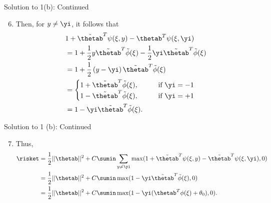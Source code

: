 \documentclass[aspectratio=169]{beamer}
\newcommand{\phitxi}{\tilde{\phi}(\xi)}
\renewcommand{\phixi}{\phi(\xi)}
\newcommand{\psixiy}{\psi(\xi, y)}
\newcommand{\psixiyi}{\psi(\xi, \yi)}
\newcommand{\thetabt}{\tilde{\thetab}}
\begin{document}
\begin{frame}{Solution to 1(b): Continued}
	\begin{enumerate}
		\setcounter{enumi}{5}
		\item Then, for $y \neq \yi$, it follows that 
				\begin{align*}
					& 1 + \thetabt^T \psixiy - \thetab^T \psixiyi \\
					&= 1 + \frac{1}{2} y \thetabt^T \phitxi - \frac{1}{2} \yi \thetabt^T \phitxi \\
					&= 1 + \frac{1}{2} \left(y - \yi \right) \thetabt^T \phitxi \\
					&= \begin{cases}
						1 + \thetabt^T \phitxi, \qquad &\text{if} \ \yi = - 1 \\
						1 - \thetabt^T \phitxi, \qquad &\text{if} \ \yi = +1 \\
					\end{cases} \\
					&= 1 - \yi \thetabt^T \phitxi. \\
				\end{align*}
	\end{enumerate}
\end{frame}

\begin{frame}{Solution to 1 (b): Continued}
	\begin{enumerate}
		\setcounter{enumi}{6}
		\item Thus, 
				\begin{align*}
					\risket &= \frac{1}{2}||\thetab||^2 + C \sumin \sum_{y \neq \yi} \max(1 + \thetabt^T \psixiy - \thetabt^T \psixiyi, 0) \\
					&= \frac{1}{2} ||\thetab||^2 + C \sumin \max(1 - \yi \thetabt^T\phitxi, 0) \\
					&= \frac{1}{2} ||\thetab||^2 + C \sumin \max(1 - \yi (\thetab^T \phixi + \theta_0), 0).
				\end{align*}
	\end{enumerate}
\end{frame}
\end{document}
